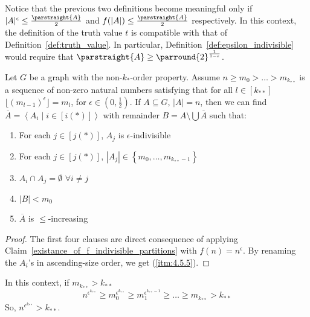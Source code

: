 
    \remark
        Notice that the previous two definitions become meaningful only if $|A|^{\epsilon} \leq \frac{\parstraight{A}}{2}$ and
        $f(|A|) \leq \frac{\parstraight{A}}{2}$ respectively.
        In this context, the definition of the truth value $t$ is compatible with that of Definition~\ref{def:truth_value}.
        In particular, Definition~\ref{def:epsilon_indivisible} would require that $\parstraight{A} \geq \parround{2}^{\frac{1}{1-\epsilon}}$.


    \lemma[Claim 4.5]\label{existance_of_ordered_epsilon_indivisible_partitions}
    Let $G$ be a graph with the non-$k_{*}$-order property.
    Assume $n \geq m_0 > \dots > m_{k_{**}}$ is a sequence of non-zero natural numbers satisfying that for all $l \in [k_{**}]$
        $\lfloor (m_{l-1})^\epsilon \rfloor = m_l$, for $\epsilon \in (0, \frac{1}{2})$.
    If $A \subseteq G$, $|A| = n$, then we can find $\overline{A} = \left< A_i \mid i \in [i(*)] \right>$ with remainder
        $B = A \setminus \bigcup \overline{A}$ such that:
    \begin{enumerate}  %
        \item \label{itm:4.5.1} For each $j \in [j(*)]$, $A_j$ is $\epsilon$-indivisible
        \item \label{itm:4.5.2} For each $j \in [j(*)]$, $|A_j| \in \left\{ m_0, \dots, m_{k_{**}-1} \right\}$
        \item \label{itm:4.5.3} $A_i \cap A_j = \emptyset$ $\forall i \neq j$
        \item \label{itm:4.5.4} $|B| < m_0$
        \item \label{itm:4.5.5} $\overline{A}$ is $\leq$-increasing
    \end{enumerate}
        \begin{proof}
            The first four clauses are direct consequence of applying Claim~\ref{existance_of_f_indivisible_partitions}
                with $f(n) = n^\epsilon$.
            By renaming the $A_i$'s in ascending-size order, we get (\ref{itm:4.5.5}).
        \end{proof}


    \remark
    In this context, if $m_{k_{**}} > k_{**}$
    \[
        n^{\epsilon^{k_{**}}} \geq m_0^{\epsilon^{k_{**}}} \geq m_1^{\epsilon^{k_{**}-1}} \geq \dots \geq m_{k_{**}} > k_{**}
    \]
    So, $n^{\epsilon^{k_{**}}} > k_{**}$.

